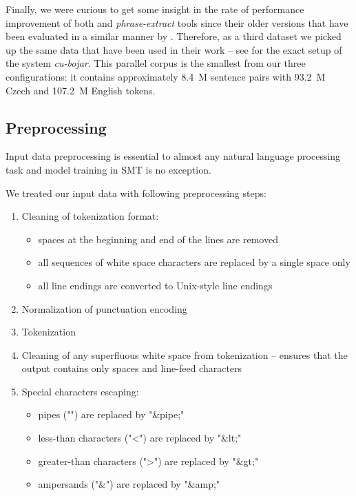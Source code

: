 Finally, we were curious to get some insight in the rate of performance improvement
of both \eppex{} and \emph{phrase-extract} tools since their older versions that have
been evaluated in a similar manner by \citet{przywara:eppex}.
Therefore, as a third dataset we picked up the same data that have been used in their
work -- see \citet{marecek:twostep} for the exact setup of the system \emph{cu-bojar}.
This parallel corpus is the smallest from our three configurations: it contains
approximately 8.4~M sentence pairs with 93.2~M Czech and 107.2~M English tokens.

\subsection{Preprocessing}

Input data preprocessing is essential to almost any natural language processing task
and model training in SMT is no exception.

We treated our input data with following preprocessing steps:
\begin{enumerate}
  \item Cleaning of tokenization format:
  \begin{itemize}
    \item spaces at the beginning and end of the lines are removed
    \item all sequences of white space characters are replaced by a single space only
    \item all line endings are converted to Unix-style line endings
  \end{itemize}
  \item Normalization of punctuation encoding
  \item Tokenization
  \item Cleaning of any superfluous white space from tokenization -- ensures that the output contains only spaces and line-feed characters
  \item Special characters escaping:
  \begin{itemize}
    \item pipes ("\textbar") are replaced by "\&pipe;"
    \item less-than characters ("<") are replaced by "\&lt;"
    \item greater-than characters (">") are replaced by "\&gt;"
    \item ampersands ("\&") are replaced by "\&amp;"
  \end{itemize}
\end{enumerate}

